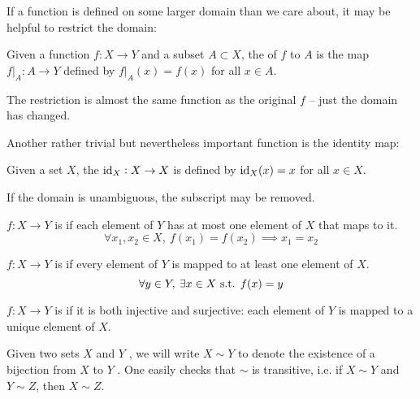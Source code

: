 If a function is defined on some larger domain than we care about, it may be helpful to restrict the domain:

\begin{definition}[Restriction]
Given a function $f:X \to Y$ and a subset $A \subset X$, the  of $f$ to $A$ is the map $f|_A:A \to Y$ defined by $f|_A(x) = f(x)$ for all $x \in A$.
\end{definition}

The restriction is almost the same function as the original $f$ -- just the domain has changed.

Another rather trivial but nevertheless important function is the identity map:

\begin{definition}
Given a set $X$, the  $\operatorname{id}_X:X \to X$ is defined by $\operatorname{id}_X(x) = x$ for all $x \in X$.
\end{definition}

\begin{notation}
If the domain is unambiguous, the subscript may be removed.
\end{notation}

\begin{definition}[Injectivity]
$f:X\to Y$ is  if each element of $Y$ has at most one element of $X$ that maps to it.
\[\forall x_1,x_2\in X,\:f(x_1)=f(x_2) \implies x_1=x_2\]
\end{definition}

\begin{definition}[Surjectivity]
$f:X\to Y$ is  if every element of $Y$ is mapped to at least one element of $X$.
\[ \forall y\in Y,\:\exists x\in X \text{ s.t. } f(x)=y \]
\end{definition}

\begin{definition}[Bijectivity]
$f:X\to Y$ is  if it is both injective and surjective: each element of $Y$ is mapped to a unique element of $X$.
\end{definition}

\begin{notation}
Given two sets $X$ and $Y$ , we will write $X\sim Y$ to denote the existence of a bijection from $X$ to $Y$ . One easily checks that $\sim$ is transitive, i.e. if $X\sim Y$ and $Y\sim Z$, then $X\sim Z$.
\end{notation}

